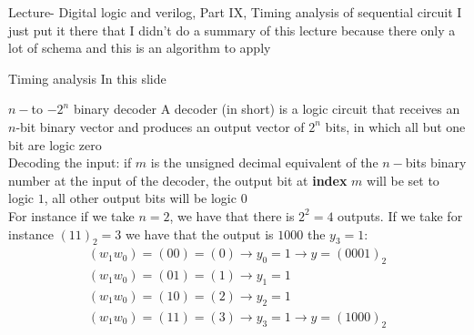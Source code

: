 \begin{parag}{Lecture- Digital logic and verilog, Part IX, Timing analysis of sequential circuit}
    I just put it there that I didn't do a summary of this lecture because there only a lot of schema and this is an algorithm to apply
    
\end{parag}
\begin{parag}{Timing analysis}
    In this slide
\end{parag}

\begin{parag}{$n-$to $-2^n$ binary decoder}
    A decoder (in short) is a logic circuit that receives an $n$-bit binary vector and produces an output vector of $2^n$ bits, in which all but one bit are logic zero\\
    Decoding the input: if $m$ is the unsigned decimal equivalent of the $n-$bits binary number at the input of the decoder, the output bit at \textbf{index} $ m$ will be set to logic $1$, all other output bits will be logic 0\\
    For instance if we take $n = 2$, we have that there is $2^2 = 4$ outputs. If we take for instance $\left(11\right)_2 = 3$ we have that the output is $1000$ the $y_3 = 1$:
    \begin{align*} 
        \left(w_1w_0\right) = \left(00\right) = \left(0\right) \to y_0 = 1 \to y = \left(0001\right)_2\\
        \left(w_1w_0\right) = \left(01\right) = \left(1\right) \to y_1 = 1\\
        \left(w_1w_0\right) = \left(10\right) = \left(2\right) \to y_2 = 1\\
        \left(w_1w_0\right) = \left(11\right) = \left(3\right) \to y_3 = 1 \to y = \left(1000\right)_2
    \end{align*}


\end{parag}
